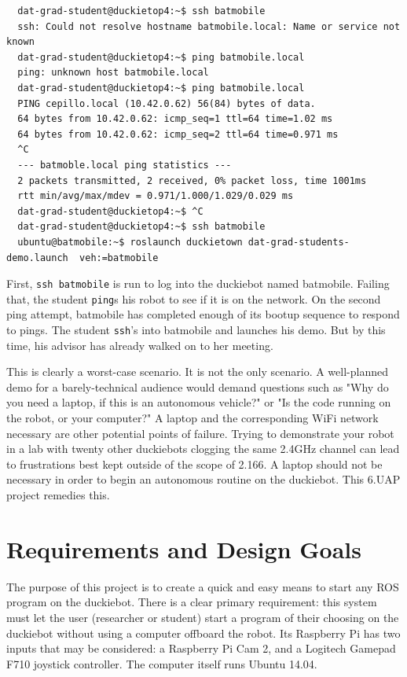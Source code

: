 \documentclass[titlepage]{article}
\begin{document}
\begin{verbatim}
  dat-grad-student@duckietop4:~$ ssh batmobile
  ssh: Could not resolve hostname batmobile.local: Name or service not known
  dat-grad-student@duckietop4:~$ ping batmobile.local
  ping: unknown host batmobile.local
  dat-grad-student@duckietop4:~$ ping batmobile.local
  PING cepillo.local (10.42.0.62) 56(84) bytes of data.
  64 bytes from 10.42.0.62: icmp_seq=1 ttl=64 time=1.02 ms
  64 bytes from 10.42.0.62: icmp_seq=2 ttl=64 time=0.971 ms
  ^C
  --- batmoble.local ping statistics ---
  2 packets transmitted, 2 received, 0% packet loss, time 1001ms
  rtt min/avg/max/mdev = 0.971/1.000/1.029/0.029 ms
  dat-grad-student@duckietop4:~$ ^C
  dat-grad-student@duckietop4:~$ ssh batmobile
  ubuntu@batmobile:~$ roslaunch duckietown dat-grad-students-demo.launch  veh:=batmobile
 \end{verbatim}

First, \texttt{ssh batmobile} is run to log into the duckiebot named batmobile. Failing that, the student \texttt{ping}s his robot to see if it is on the network. On the second ping attempt, batmobile has completed enough of its bootup sequence to respond to pings. The student \texttt{ssh}'s into batmobile and launches his demo. But by this time, his advisor has already walked on to her meeting. 

This is clearly a worst-case scenario. It is not the only scenario.
A well-planned demo for a barely-technical audience would demand questions such as "Why do you need a laptop, if this is an autonomous vehicle?" or "Is the code running on the robot, or your computer?" A laptop and the corresponding WiFi network necessary are other potential points of failure. Trying to demonstrate your robot in a lab with twenty other duckiebots clogging the same 2.4GHz channel can lead to frustrations best kept outside of the scope of 2.166. A laptop should not be necessary in order to begin an autonomous routine on the duckiebot. This 6.UAP project remedies this. 
\section{Requirements and Design Goals}
The purpose of this project is to create a quick and easy means to start any ROS program on the duckiebot. There is a clear primary requirement: this system must let the user (researcher or student) start a program of their choosing on the duckiebot without using a computer offboard the robot. Its Raspberry Pi has two inputs that may be considered: a Raspberry Pi Cam 2, and a Logitech Gamepad F710 joystick controller. The computer itself runs Ubuntu 14.04.
\end{document}
